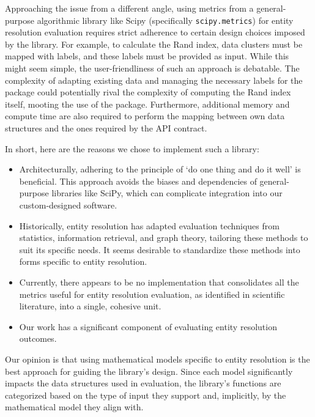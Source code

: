 \documentclass[a4paper,twoside]{article}
\begin{document}
    Approaching the issue from a different angle, using metrics from a
    general-purpose algorithmic library like Scipy (specifically
    \texttt{scipy.metrics}) for entity resolution evaluation requires strict
    adherence to certain design choices imposed by the library.
    For example, to calculate the Rand index, data clusters must be mapped with
    labels, and these labels must be provided as input.
    While this might seem simple, the user-friendliness of such an approach is
    debatable.
    The complexity of adapting existing data and managing the necessary labels
    for the package could potentially rival the complexity of computing the Rand
    index itself, mooting the use of the package.
    Furthermore, additional memory and compute time are also required to perform
    the mapping between own data structures and the ones required by the API
    contract.

    In short, here are the reasons we chose to implement such a library:
    \begin{itemize}
    \item Architecturally, adhering to the principle of `do one thing and do
    it well' is beneficial.
    This approach avoids the biases and dependencies of general-purpose
    libraries like SciPy, which can complicate integration into our
    custom-designed software.
    \item Historically, entity resolution has adapted evaluation techniques from
    statistics, information retrieval, and graph theory, tailoring these methods
    to suit its specific needs.
    It seems desirable to standardize these methods into forms specific to
    entity resolution.
    \item Currently, there appears to be no implementation that consolidates all
    the metrics useful for entity resolution evaluation, as identified in
    scientific literature, into a single, cohesive unit.
    \item Our work has a significant component of evaluating entity resolution
    outcomes.
    \end{itemize}

    Our opinion is that using mathematical models specific to entity resolution
    is the best approach for guiding the library's design.
    Since each model significantly impacts the data structures used in
    evaluation, the library's functions are categorized based on the type of
    input they support and, implicitly, by the mathematical model they align
    with.
\end{document}
